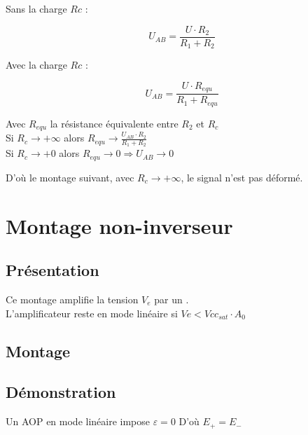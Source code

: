 

\begin{reponse}

Sans la charge $Rc$ : 

$$ U_{AB}= \frac{U \cdot R_2}{R_1+R_2}$$

Avec  la charge $Rc$ :

$$ U_{AB}= \frac{U \cdot R_{equ}}{R_1+R_{equ}}$$


Avec $R_{equ}$ la résistance équivalente entre $R_2$ et $R_c$ \\



Si $R_c \rightarrow + \infty$ alors $R_{equ} \rightarrow \frac{U_{AB} \cdot R_2}{R_1+R_2}$ \\

Si $R_c \rightarrow + 0 $ alors $R_{equ} \rightarrow 0 \Rightarrow U_{AB} \rightarrow 0$

\end{reponse}


D'où le montage suivant, avec $R_c \rightarrow + \infty$, le signal n'est pas déformé.




\chapter{Montage non-inverseur}


\section{Présentation}

Ce montage amplifie la tension $V_e$ par un . \\
L’amplificateur reste en mode linéaire si $Ve < Vcc_{sat} \cdot A_0$

\section{Montage}


\section{Démonstration}

Un AOP en mode linéaire impose $\varepsilon=0$
D'où $E_+ =E_-$ 

